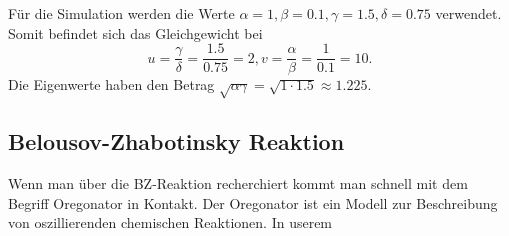 Für die Simulation werden die Werte \(\alpha = 1, \beta = 0.1, \gamma = 1.5, \delta = 0.75\) verwendet.
Somit befindet sich das Gleichgewicht bei
\begin{equation}
    u = \frac{\gamma}{\delta} = \frac{1.5}{0.75} = 2, 
    v = \frac{\alpha}{\beta} = \frac{1}{0.1} = 10.
\end{equation}
Die Eigenwerte haben den Betrag \(\sqrt{\alpha\gamma} = \sqrt{1 \cdot 1.5} \approx 1.225\).


\subsection{Belousov-Zhabotinsky Reaktion
\label{reaktdiff:subsection:bonorum}}
Wenn man über die BZ-Reaktion recherchiert kommt man schnell mit dem Begriff Oregonator in Kontakt.
Der Oregonator ist ein Modell zur Beschreibung von oszillierenden chemischen Reaktionen.
In userem


